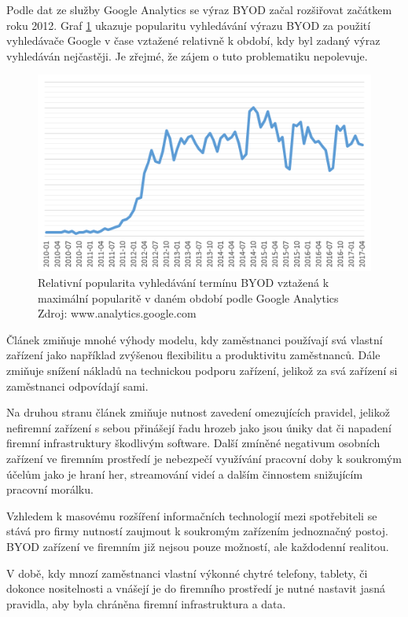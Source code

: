 Podle dat ze služby Google Analytics  se výraz BYOD začal rozšiřovat začátkem roku 2012. Graf \ref{hledaniBYOD} ukazuje popularitu vyhledávání výrazu BYOD za použití vyhledávače Google v čase vztažené relativně k období, kdy byl zadaný výraz vyhledáván nejčastěji. Je zřejmé, že zájem o tuto problematiku nepolevuje.

\begin{figure}[h!]\label{hledaniBYOD}
\centering
\includegraphics[width=13cm]{img/hledaniBYOD}
\caption{Relativní popularita vyhledávání termínu BYOD vztažená k maximální popularitě v daném období podle Google Analytics Zdroj: www.analytics.google.com } 
\end{figure}
 

Článek  zmiňuje mnohé výhody modelu, kdy zaměstnanci používají svá vlastní zařízení jako například zvýšenou flexibilitu a produktivitu zaměstnanců. Dále zmiňuje snížení nákladů na technickou podporu zařízení, jelikož za svá zařízení si zaměstnanci odpovídají sami.

Na druhou stranu článek zmiňuje nutnost zavedení omezujících pravidel, jelikož nefiremní zařízení s sebou přinášejí řadu hrozeb jako jsou úniky dat či napadení firemní infrastruktury škodlivým software.  Další zmíněné negativum osobních zařízení ve firemním prostředí je nebezpečí využívání pracovní doby k soukromým účelům jako je hraní her, streamování videí a dalším činnostem snižujícím pracovní morálku.

Vzhledem k masovému rozšíření informačních technologií mezi spotřebiteli se stává pro firmy nutností zaujmout k soukromým zařízením jednoznačný postoj. BYOD zařízení ve firemním již nejsou pouze možností, ale každodenní realitou.

V době, kdy mnozí zaměstnanci vlastní výkonné chytré telefony, tablety, či dokonce nositelnosti a vnášejí je do firemního prostředí je nutné nastavit jasná pravidla, aby byla chráněna firemní infrastruktura a data.


